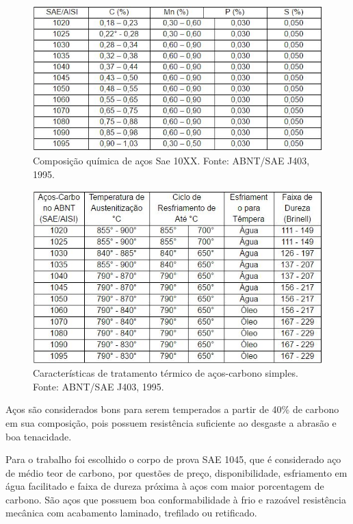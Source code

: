 \begin{figure}[!ht]
	\centering
	\label{tab_sae1}
	\includegraphics[keepaspectratio=true,scale=0.8]{figuras/tab_sae1.JPG}
	\caption{Composição química de aços Sae 10XX\@. Fonte: ABNT/SAE J403, 1995.}
\end{figure}

\begin{figure}[!ht]
	\centering
	\label{tab_sae2}
	\includegraphics[keepaspectratio=true,scale=0.8]{figuras/tab_sae2.JPG}
	\caption{Características de tratamento térmico de aços-carbono simples.  Fonte: ABNT/SAE J403, 1995.}
\end{figure}

Aços são considerados bons para serem temperados a partir de 40\% de carbono em sua composição, pois possuem resistência suficiente ao desgaste a abrasão e boa tenacidade.

Para o trabalho foi escolhido o corpo de prova SAE 1045, que é considerado aço de médio teor de carbono, por questões de preço, disponibilidade, esfriamento em água facilitado e faixa de dureza próxima à aços com maior porcentagem de carbono.
São aços que possuem boa conformabilidade à frio e razoável resistência mecânica com acabamento laminado, trefilado ou retificado.

